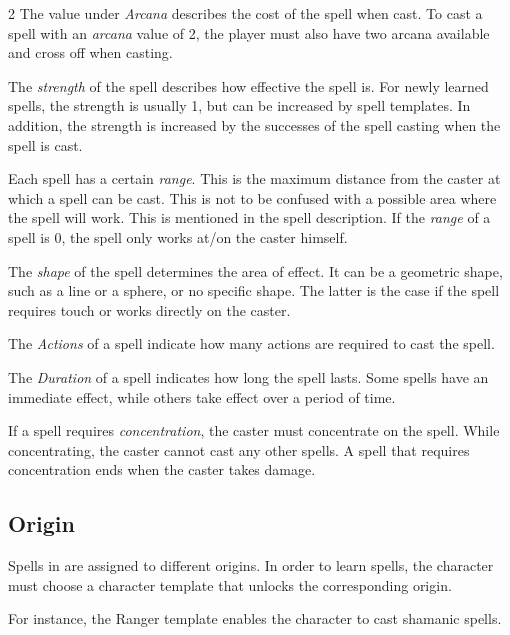 \begin{multicols}{2}
The value under \textit{Arcana} describes the cost of the spell when cast. To cast a spell with an \textit{arcana} value of 2, the player must also have two arcana available and cross off when casting.

The \textit{strength} of the spell describes how effective the spell is. For newly learned spells, the strength is usually 1, but can be increased by spell templates. In addition, the strength is increased by the successes of the spell casting when the spell is cast.

Each spell has a certain \textit{range}. This is the maximum distance from the caster at which a spell can be cast. This is not to be confused with a possible area where the spell will work. This is mentioned in the spell description. If the \textit{range} of a spell is 0, the spell only works at/on the caster himself.

The \textit{shape} of the spell determines the area of effect. It can be a geometric shape, such as a line or a sphere, or no specific shape. The latter is the case if the spell requires touch or works directly on the caster.

The \textit{Actions} of a spell indicate how many actions are required to cast the spell.

The \textit{Duration} of a spell indicates how long the spell lasts. Some spells have an immediate effect, while others take effect over a period of time.

If a spell requires \textit{concentration}, the caster must concentrate on the spell. While concentrating, the caster cannot cast any other spells. A spell that requires concentration ends when the caster takes damage.

\subsection{Origin}

Spells in  are assigned to different origins. In order to learn spells, the character must choose a character template that unlocks the corresponding origin.

For instance, the Ranger template enables the character to cast shamanic spells.


\end{multicols}
